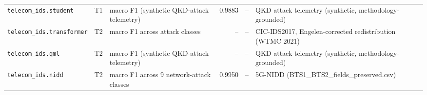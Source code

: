 \begin{table}[htbp]
\begin{tabularx}{\textwidth}{@{}>{\raggedright\arraybackslash}p{3.3cm} c >{\raggedright\arraybackslash}X r r >{\raggedright\arraybackslash}X@{}}
\texttt{telecom\_\allowbreak{}ids.\allowbreak{}student} & T1 & macro F1 (synthetic QKD-attack telemetry) & 0.9883 & -- & QKD attack telemetry (synthetic, methodology-grounded) \\
\texttt{telecom\_\allowbreak{}ids.\allowbreak{}transformer} & T2 & macro F1 across attack classes & -- & -- & CIC-IDS2017, Engelen-corrected redistribution (WTMC 2021) \\
\texttt{telecom\_\allowbreak{}ids.\allowbreak{}qml} & T2 & macro F1 (synthetic QKD-attack telemetry) & -- & -- & QKD attack telemetry (synthetic, methodology-grounded) \\
\texttt{telecom\_\allowbreak{}ids.\allowbreak{}nidd} & T2 & macro F1 across 9 network-attack classes & 0.9950 & -- & 5G-NIDD (BTS1\_\allowbreak{}BTS2\_\allowbreak{}fields\_\allowbreak{}preserved.csv) \\
\bottomrule
\end{tabularx}
\end{table}
